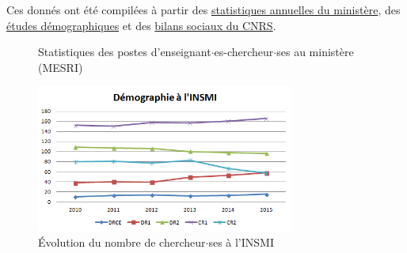 Ces donn\'es ont \'et\'e compil\'ees \`a partir des \href{http://www.enseignementsup-recherche.gouv.fr/cid22708/bilans-statistiques.html}{%
statistiques annuelles du minist\`ere}, 
des \href{http://www.enseignementsup-recherche.gouv.fr/cid85019/fiches-demographiques-des-sections-du-cnu.html}{\'etudes d\'emographiques} et
des \href{http://www.dgdr.cnrs.fr/drh/omes/bilan-social.htm}{bilans sociaux du CNRS}. 
%
\begin{center}
\begin{figure}[p]
\hfill
{}
\caption{Statistiques des postes d'enseignant$\cdot$es-chercheur$\cdot$ses au minist\`ere (MESRI)}
\label{fig.cnu}
\end{figure}

\begin{figure}[p]
\begin{center}
\includegraphics[width=8.5cm]{Images/stats_insmi}
\caption{\'Evolution du nombre de chercheur$\cdot$ses \`a l'INSMI}\label{fig.insmi}
\end{center}
\end{figure}
\end{center}


